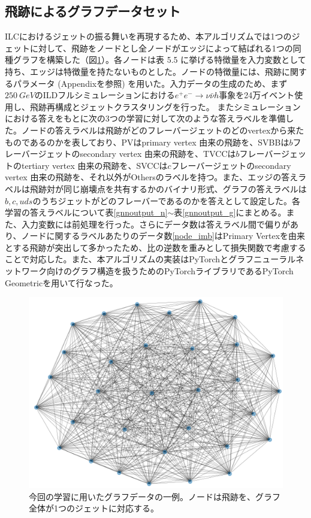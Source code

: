 \subsection{飛跡によるグラフデータセット}
ILCにおけるジェットの振る舞いを再現するため、本アルゴリズムでは1つのジェットに対して、飛跡をノードとし全ノードがエッジによって結ばれる1つの同種グラフを構築した（図\ref{1graph}）。各ノードは表 5.5%
に挙げる特徴量を入力変数として持ち、エッジは特徴量を持たないものとした。ノードの特徴量には、飛跡に関するパラメータ (Appendixを参照) を用いた。入力データの生成のため、まず$\SI{250}{GeV}$のILDフルシミュレーションにおける$e^+e^- \rightarrow \nu \bar{\nu} h$事象を24万イベント使用し、飛跡再構成とジェットクラスタリングを行った。%
またシミュレーションにおける答えをもとに次の3つの学習に対して次のような答えラベルを準備した。ノードの答えラベルは飛跡がどのフレーバージェットのどのvertexから来たものであるのかを表しており、PVはprimary vertex 由来の飛跡を、SVBBは$b$フレーバージェットのsecondary vertex 由来の飛跡を、TVCCは$b$フレーバージェットのtertiary vertex 由来の飛跡を、SVCCは$c$フレーバージェットのsecondary vertex 由来の飛跡を、それ以外がOthersのラベルを持つ。また、エッジの答えラベルは飛跡対が同じ崩壊点を共有するかのバイナリ形式、グラフの答えラベルは$b, c, uds$のうちジェットがどのフレーバーであるのかを答えとして設定した。各学習の答えラベルについて表\ref{gnnoutput_n}$\sim$表\ref{gnnoutput_g}にまとめる。また、入力変数には前処理を行った。さらにデータ数は答えラベル間で偏りがあり、ノードに関するラベルあたりのデータ数\ref{node_imb}はPrimary Vertexを由来とする飛跡が突出して多かったため、比の逆数を重みとして損失関数で考慮することで対応した。また、本アルゴリズムの実装はPyTorch\cite{pytorch}とグラフニューラルネットワーク向けのグラフ構造を扱うためのPyTorchライブラリであるPyTorch Geometric\cite{pyg}を用いて行なった。
\begin{figure}[H]
	\begin{center}
 \includegraphics[keepaspectratio, scale=0.5]
 	{Figure/Flavortagging/graphexample.png}
 		\caption[グラフデータの例]{今回の学習に用いたグラフデータの一例。ノードは飛跡を、グラフ全体が1つのジェットに対応する。}
 		\label{1graph}
	\end{center}
\end{figure}

